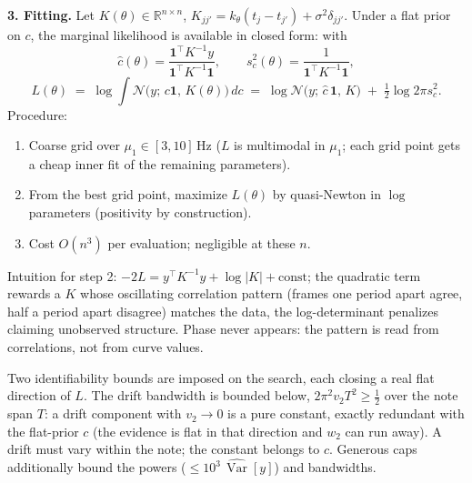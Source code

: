 \documentclass[10pt,a4paper]{article}
\newcommand{\N}{\mathcal{N}}
\newcommand{\one}{\mathbf{1}}
\begin{document}
\textbf{3. Fitting.}
Let $K(\theta) \in \mathbb{R}^{n \times n}$,
$K_{jj'} = k_\theta(t_j - t_{j'}) + \sigma^2 \delta_{jj'}$.
Under a flat prior on $c$, the marginal likelihood is available in closed
form: with
\begin{equation}
\hat c(\theta) = \frac{\one^\top K^{-1} y}{\one^\top K^{-1} \one},
\qquad
s_c^2(\theta) = \frac{1}{\one^\top K^{-1} \one},
\label{eq:gls}
\end{equation}
\begin{equation}
L(\theta) \;=\; \log \int \N\bigl(y;\, c \one,\, K(\theta)\bigr)\, dc
\;=\; \log \N\bigl(y;\, \hat c\,\one,\, K\bigr)
\;+\; \tfrac{1}{2} \log 2\pi s_c^2 .
\label{eq:evidence}
\end{equation}
Procedure:
\begin{enumerate}[nosep,leftmargin=2em]
  \item Coarse grid over $\mu_1 \in [3, 10]$\,Hz ($L$ is multimodal in
        $\mu_1$; each grid point gets a cheap inner fit of the remaining
        parameters).
  \item From the best grid point, maximize $L(\theta)$ by quasi-Newton in
        $\log$ parameters (positivity by construction).
  \item Cost $O(n^3)$ per evaluation; negligible at these $n$.
\end{enumerate}
Intuition for step 2: $-2L = y^\top K^{-1} y + \log |K| + \text{const}$;
the quadratic term rewards a $K$ whose oscillating correlation pattern
(frames one period apart agree, half a period apart disagree) matches the
data, the log-determinant penalizes claiming unobserved structure. Phase
never appears: the pattern is read from correlations, not from curve
values.

Two identifiability bounds are imposed on the search, each closing a real
flat direction of $L$. The drift bandwidth is bounded below,
$2\pi^2 v_2 T^2 \ge \tfrac12$ over the note span $T$: a drift component
with $v_2 \to 0$ is a pure constant, exactly redundant with the
flat-prior $c$ (the evidence is flat in that direction and $w_2$ can run
away). A drift must vary within the note; the constant belongs to $c$.
Generous caps additionally bound the powers ($\le 10^3\,
\widehat{\operatorname{Var}}[y]$) and bandwidths.
\end{document}
